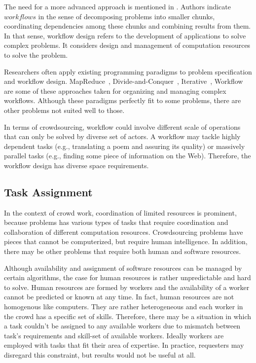The need for a more advanced approach is mentioned in \cite{Kittur2013}. Authors 
indicate $workflows$ in the sense of decomposing problems into smaller chunks, 
coordinating dependencies among these chunks and combining results from them. 
In that sense, workflow design refers to the development of applications to solve 
complex problems. It considers design and management of computation resources 
to solve the problem.

Researchers often apply existing programming paradigms to problem specification 
and workflow design. MapReduce~\cite{Kittur2011, Ahmad2011}, 
Divide-and-Conquer~\cite{Kulkarni2012}, 
Iterative~\cite{Little2009}, 
Workflow ~\cite{Kokciyan2012} are some of these approaches taken for 
organizing and managing complex workflows. Although these paradigms 
perfectly fit to some problems, there are other problems not suited well to those. 

In terms of crowdsourcing, workflow could involve different scale of operations that 
can only be solved by diverse set of actors. A workflow may tackle highly dependent 
tasks (e.g., translating a poem and assuring its quality) or massively parallel 
tasks (e.g., finding some piece of information on the Web). Therefore, the workflow 
design has diverse space requirements.

\subsection{Task Assignment}
In the context of crowd work, coordination of limited resources is prominent, 
because problems has various types of tasks that require coordination and 
collaboration of different computation resources. Crowdsourcing problems  
have pieces that cannot be computerized, but require human intelligence. In 
addition, there may be other problems that require both human and software 
resources.

Although availability and assignment of software resources can be managed 
by certain algorithms, the case for human resources is rather unpredictable and 
hard to solve. Human resources are formed by workers and the availability of a 
worker cannot be predicted or known at any time. In fact, human resources 
are not homogenous like computers. They are rather heterogeneous and each 
worker in the crowd has a specific set of skills. Therefore, there may be a situation 
in which a task couldn't be assigned to any available workers due to mismatch 
between task's requirements and skill-set of available workers. Ideally workers 
are employed with tasks that fit their area of expertise. In practice, requesters 
may disregard this constraint, but results would not be useful at all.

